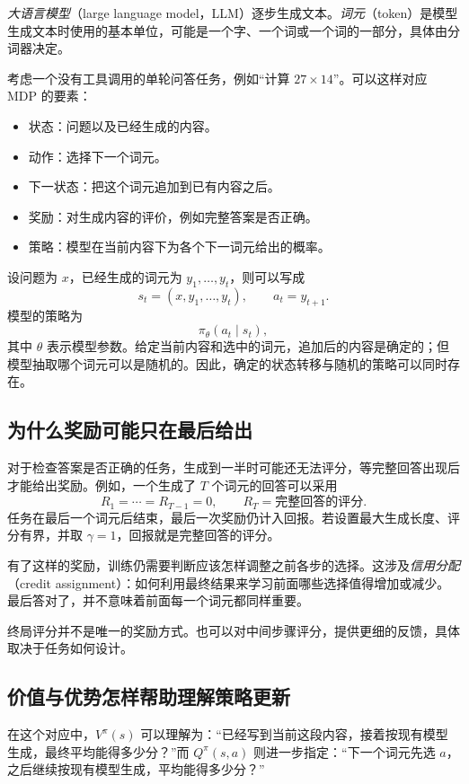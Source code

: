 \documentclass[UTF8,12pt,a4paper,fontset=fandol]{ctexart}
\begin{document}
\emph{大语言模型}（large language model，LLM）逐步生成文本。\emph{词元}（token）是模型生成文本时使用的基本单位，可能是一个字、一个词或一个词的一部分，具体由分词器决定。

考虑一个没有工具调用的单轮问答任务，例如“计算 $27\times14$”。可以这样对应 MDP 的要素：
\begin{itemize}
  \item 状态：问题以及已经生成的内容。
  \item 动作：选择下一个词元。
  \item 下一状态：把这个词元追加到已有内容之后。
  \item 奖励：对生成内容的评价，例如完整答案是否正确。
  \item 策略：模型在当前内容下为各个下一词元给出的概率。
\end{itemize}

设问题为 $x$，已经生成的词元为 $y_1,\ldots,y_t$，则可以写成
\[
  s_t=(x,y_1,\ldots,y_t),\qquad a_t=y_{t+1}.
\]
模型的策略为
\[
  \pi_\theta(a_t\mid s_t),
\]
其中 $\theta$ 表示模型参数。给定当前内容和选中的词元，追加后的内容是确定的；但模型抽取哪个词元可以是随机的。因此，确定的状态转移与随机的策略可以同时存在。

\subsection{为什么奖励可能只在最后给出}

对于检查答案是否正确的任务，生成到一半时可能还无法评分，等完整回答出现后才能给出奖励。例如，一个生成了 $T$ 个词元的回答可以采用
\[
  R_1=\cdots=R_{T-1}=0,
  \qquad R_T=\text{完整回答的评分}.
\]
任务在最后一个词元后结束，最后一次奖励仍计入回报。若设置最大生成长度、评分有界，并取 $\gamma=1$，回报就是完整回答的评分。

有了这样的奖励，训练仍需要判断应该怎样调整之前各步的选择。这涉及\emph{信用分配}（credit assignment）：如何利用最终结果来学习前面哪些选择值得增加或减少。最后答对了，并不意味着前面每一个词元都同样重要。

终局评分并不是唯一的奖励方式。也可以对中间步骤评分，提供更细的反馈，具体取决于任务如何设计。

\subsection{价值与优势怎样帮助理解策略更新}

在这个对应中，$V^\pi(s)$ 可以理解为：“已经写到当前这段内容，接着按现有模型生成，最终平均能得多少分？”而 $Q^\pi(s,a)$ 则进一步指定：“下一个词元先选 $a$，之后继续按现有模型生成，平均能得多少分？”
\end{document}
